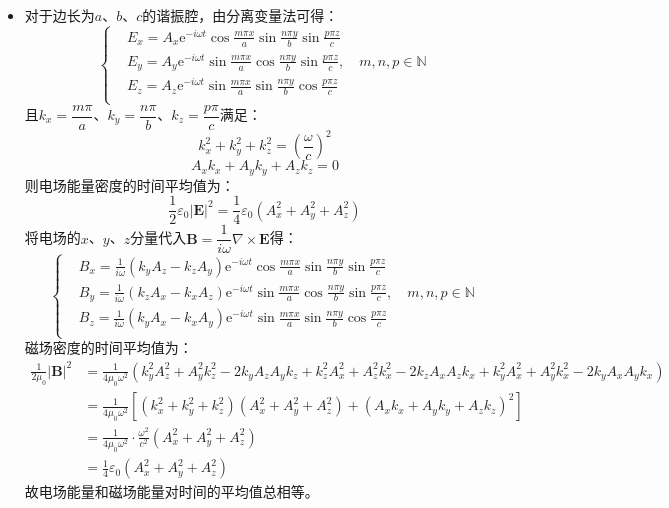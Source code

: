 \documentclass[a4paper,fontset=none]{ctexart}
\begin{document}
\begin{itemize}
    \item[15.]
    对于边长为$a$、$b$、$c$的谐振腔，由分离变量法可得：
    \[
        \left\{
        \begin{aligned}
            & E_x = A_x\mathrm{e}^{-i\omega t}\cos\frac{m\pi x}{a}\sin\frac{n\pi y}{b}\sin\frac{p\pi z}{c} \\
            & E_y = A_y\mathrm{e}^{-i\omega t}\sin\frac{m\pi x}{a}\cos\frac{n\pi y}{b}\sin\frac{p\pi z}{c},\quad m,n,p\in\mathbb{N} \\
            & E_z = A_z\mathrm{e}^{-i\omega t}\sin\frac{m\pi x}{a}\sin\frac{n\pi y}{b}\cos\frac{p\pi z}{c} \\
        \end{aligned}
        \right.
    \]
    且$k_x=\dfrac{m\pi}{a}$、$k_y=\dfrac{n\pi}{b}$、$k_z=\dfrac{p\pi}{c}$满足：
    \[
        k_x^2 + k_y^2 + k_z^2 = \left(\frac{\omega}{c}\right)^2
    \]
    \[
        A_x k_x+A_y k_y + A_z k_z = 0
    \]
    则电场能量密度的时间平均值为：
    \[
        \frac{1}{2}\varepsilon_0|\bm{E}|^2 = \frac{1}{4}\varepsilon_0(A_x^2 + A_y^2 + A_z^2)
    \]
    将电场的$x$、$y$、$z$分量代入$\bm{B}=\dfrac{1}{i\omega}\nabla\times\bm{E}$得：
    \[
        \left\{
        \begin{aligned}
            & B_x = \frac{1}{i\omega}(k_y A_z - k_z A_y)\mathrm{e}^{-i\omega t}\cos\frac{m\pi x}{a}\sin\frac{n\pi y}{b}\sin\frac{p\pi z}{c} \\
            & B_y = \frac{1}{i\omega}(k_z A_x - k_x A_z)\mathrm{e}^{-i\omega t}\sin\frac{m\pi x}{a}\cos\frac{n\pi y}{b}\sin\frac{p\pi z}{c},\quad m,n,p\in\mathbb{N} \\
            & B_z = \frac{1}{i\omega}(k_y A_x - k_x A_y)\mathrm{e}^{-i\omega t}\sin\frac{m\pi x}{a}\sin\frac{n\pi y}{b}\cos\frac{p\pi z}{c} \\
        \end{aligned}
        \right.
    \]
    磁场密度的时间平均值为：
    \begin{align*}
        \frac{1}{2\mu_0}|\bm{B}|^2
        &= \frac{1}{4\mu_0\omega^2}(k_y^2A_z^2+A_y^2k_z^2-2k_y A_z A_y k_z+k_z^2A_x^2+A_z^2k_x^2-2k_z A_x A_z k_x+k_y^2A_x^2+A_y^2k_x^2-2k_y A_x A_y k_x) \\
        &= \frac{1}{4\mu_0\omega^2}[(k_x^2+k_y^2+k_z^2)(A_x^2+A_y^2+A_z^2) + (A_x k_x+A_y k_y + A_z k_z)^2] \\
        &= \frac{1}{4\mu_0\omega^2} \cdot \frac{\omega^2}{c^2}(A_x^2+A_y^2+A_z^2) \\
        &= \frac{1}{4}\varepsilon_0(A_x^2+A_y^2+A_z^2)
    \end{align*}
    故电场能量和磁场能量对时间的平均值总相等。

    \end{itemize}
\end{document}
